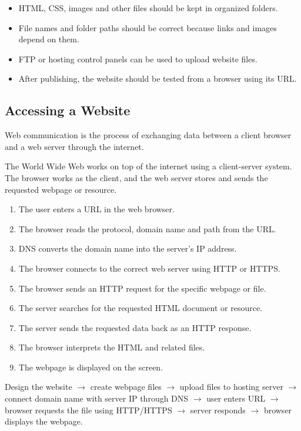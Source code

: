 \begin{itemize}
    \item HTML, CSS, images and other files should be kept in organized folders.
    \item File names and folder paths should be correct because links and images depend on them.
    \item FTP or hosting control panels can be used to upload website files.
    \item After publishing, the website should be tested from a browser using its URL.
\end{itemize}

\subsection{Accessing a Website}

\begin{definitionbox}
Web communication is the process of exchanging data between a client browser and a web server through the internet.
\end{definitionbox}

\Note The World Wide Web works on top of the internet using a client-server system. The browser works as the client, and the web server stores and sends the requested webpage or resource.

\begin{enumerate}
    \item The user enters a URL in the web browser.
    \item The browser reads the protocol, domain name and path from the URL.
    \item DNS converts the domain name into the server's IP address.
    \item The browser connects to the correct web server using HTTP or HTTPS.
    \item The browser sends an HTTP request for the specific webpage or file.
    \item The server searches for the requested HTML document or resource.
    \item The server sends the requested data back as an HTTP response.
    \item The browser interprets the HTML and related files.
    \item The webpage is displayed on the screen.
\end{enumerate}

\begin{summarybox}
Design the website $\rightarrow$ create webpage files $\rightarrow$ upload files to hosting server $\rightarrow$ connect domain name with server IP through DNS $\rightarrow$ user enters URL $\rightarrow$ browser requests the file using HTTP/HTTPS $\rightarrow$ server responds $\rightarrow$ browser displays the webpage.
\end{summarybox}

